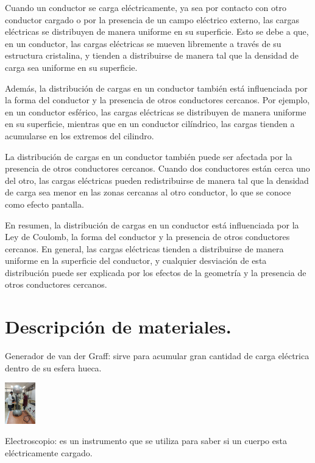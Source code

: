 \documentclass[10pt]{article}
\begin{document}
\begin{multicols}{2}
Cuando un conductor se carga eléctricamente, ya sea por contacto con otro conductor cargado o por la presencia de un campo eléctrico externo, las cargas eléctricas se distribuyen de manera uniforme en su superficie. Esto se debe a que, en un conductor, las cargas eléctricas se mueven libremente a través de su estructura cristalina, y tienden a distribuirse de manera tal que la densidad de carga sea uniforme en su superficie.

Además, la distribución de cargas en un conductor también está influenciada por la forma del conductor y la presencia de otros conductores cercanos. Por ejemplo, en un conductor esférico, las cargas eléctricas se distribuyen de manera uniforme en su superficie, mientras que en un conductor cilíndrico, las cargas tienden a acumularse en los extremos del cilindro.

La distribución de cargas en un conductor también puede ser afectada por la presencia de otros conductores cercanos. Cuando dos conductores están cerca uno del otro, las cargas eléctricas pueden redistribuirse de manera tal que la densidad de carga sea menor en las zonas cercanas al otro conductor, lo que se conoce como efecto pantalla.

En resumen, la distribución de cargas en un conductor está influenciada por la Ley de Coulomb, la forma del conductor y la presencia de otros conductores cercanos. En general, las cargas eléctricas tienden a distribuirse de manera uniforme en la superficie del conductor, y cualquier desviación de esta distribución puede ser explicada por los efectos de la geometría y la presencia de otros conductores cercanos.


\section{Descripción de materiales.}

 Generador de van der Graff: sirve para acumular gran cantidad de carga eléctrica dentro de su esfera hueca.
 
\includegraphics[width=0.1\textwidth]{Vander} 
	
	

Electroscopio: es un instrumento que se utiliza para saber si un cuerpo esta eléctricamente cargado. 


\end{multicols}
\end{document}

